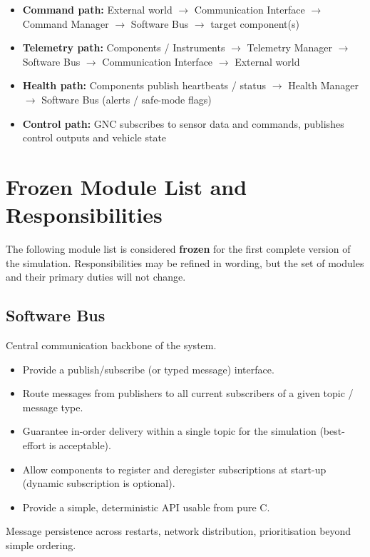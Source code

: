 \documentclass[11pt,a4paper]{article}
\begin{document}
\begin{itemize}[leftmargin=*]
    \item \textbf{Command path:} External world $\rightarrow$ Communication Interface $\rightarrow$ Command Manager $\rightarrow$ Software Bus $\rightarrow$ target component(s)
    \item \textbf{Telemetry path:} Components / Instruments $\rightarrow$ Telemetry Manager $\rightarrow$ Software Bus $\rightarrow$ Communication Interface $\rightarrow$ External world
    \item \textbf{Health path:} Components publish heartbeats / status $\rightarrow$ Health Manager $\rightarrow$ Software Bus (alerts / safe-mode flags)
    \item \textbf{Control path:} GNC subscribes to sensor data and commands, publishes control outputs and vehicle state
\end{itemize}

\section{Frozen Module List and Responsibilities}

The following module list is considered \textbf{frozen} for the first complete version of the simulation. Responsibilities may be refined in wording, but the set of modules and their primary duties will not change.

\subsection{Software Bus}
\begin{description}[style=nextline, leftmargin=1.5em]
    \item[Primary role] Central communication backbone of the system.
    \item[Responsibilities]
    \begin{itemize}
        \item Provide a publish/subscribe (or typed message) interface.
        \item Route messages from publishers to all current subscribers of a given topic / message type.
        \item Guarantee in-order delivery within a single topic for the simulation (best-effort is acceptable).
        \item Allow components to register and deregister subscriptions at start-up (dynamic subscription is optional).
        \item Provide a simple, deterministic API usable from pure C.
    \end{itemize}
    \item[Non-responsibilities] Message persistence across restarts, network distribution, prioritisation beyond simple ordering.
\end{description}
\end{document}
